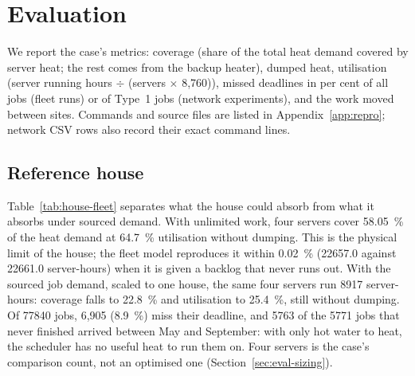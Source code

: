 \section{Evaluation}
\label{sec:evaluation}

We report the case's metrics: coverage (share of the total heat demand covered by server heat; the
rest comes from the backup heater), dumped heat, utilisation (server running hours $\div$ (servers
$\times$ 8{,}760)), missed deadlines in per cent of all jobs (fleet runs) or of Type~1 jobs (network experiments), and the work moved between sites.
Commands and source files are listed in Appendix~\ref{app:repro}; network CSV rows also
record their exact command lines.

\subsection{Reference house}
\label{sec:eval-house}

Table~\ref{tab:house-fleet} separates what the house could absorb from what it absorbs under
sourced demand. With unlimited work, four servers cover \qty{58.05}{\percent} of the heat demand at
\qty{64.7}{\percent} utilisation without dumping. This is the physical limit of the house; the
fleet model reproduces it within \qty{0.02}{\percent} (\num{22657.0} against \num{22661.0}
server-hours) when it is given a backlog that never runs out. With the sourced job demand, scaled
to one house, the same four servers run \num{8917} server-hours: coverage falls to
\qty{22.8}{\percent} and utilisation to \qty{25.4}{\percent}, still without dumping. Of
\num{77840} jobs, 6,905 (\qty{8.9}{\percent}) miss their deadline, and \num{5763} of the
\num{5771} jobs that never finished arrived between May and September: with only hot water to heat, the
scheduler has no useful heat to run them on. Four servers is the case's comparison count, not an
optimised one (Section~\ref{sec:eval-sizing}).

